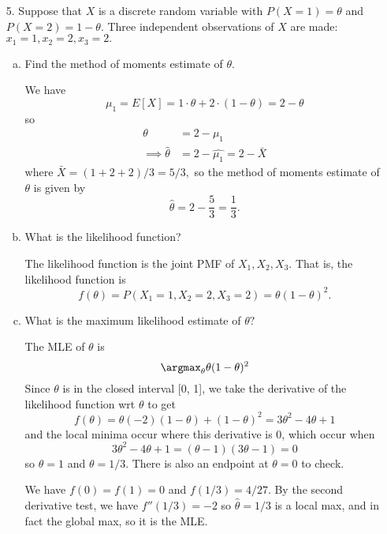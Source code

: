 \documentclass{article}
\begin{document}
\begin{itemize}
\begin{enumerate}[(a)]
		\end{enumerate}

	\item[5.] Suppose that $X$ is a discrete random variable with $P(X=1)=\theta$ and $P(X=2)=1-\theta.$ Three independent observations of $X$ are made: $x_1=1, x_2=2, x_3=2.$
		\begin{enumerate}[(a)]
			\item Find the method of moments estimate of $\theta.$
				\begin{soln}
					We have \[\mu_1=E[X]=1\cdot\theta+2\cdot(1-\theta)=2-\theta\] so
					\begin{align*}
						\theta &= 2-\mu_1 \\
						\implies \hat{\theta}&=2-\hat{\mu_1} = 2-\bar{X}
					\end{align*}
					where $\bar{X}=(1+2+2)/3=5/3,$ so the method of moments estimate of $\theta$ is given by \[\hat{\theta}=2-\frac{5}{3}=\boxed{\frac{1}{3}}.\]

				\end{soln}

			\item  What is the likelihood function?
				\begin{soln}
					The likelihood function is the joint PMF of $X_1, X_2, X_3.$ That is, the likelihood function is \[f(\theta)=P(X_1=1, X_2=2, X_3=2)=\theta(1-\theta)^2.\]

				\end{soln}

			\item What is the maximum likelihood estimate of $\theta?$
				\begin{soln}
					The MLE of $\theta$ is \[\argmax_{\theta} \theta(1-\theta)^2\] Since $\theta$ is in the closed interval [0, 1], we take the derivative of the likelihood function wrt $\theta$ to get \[f(\theta)=\theta(-2)(1-\theta)+(1-\theta)^2=3\theta^2-4\theta+1\] and the local minima occur where this derivative is 0, which occur when \[3\theta^2-4\theta+1=(\theta-1)(3\theta-1)=0\] so $\theta=1$ and $\theta=1/3.$ There is also an endpoint at $\theta=0$ to check. 

					We have $f(0)=f(1)=0$ and $f(1/3)=4/27.$ By the second derivative test, we have $f''(1/3)=-2$ so $\boxed{\hat{\theta}=1/3}$ is a local max, and in fact the global max, so it is the MLE.

				\end{soln}
				
		\end{enumerate}


\end{itemize}
\end{document}
